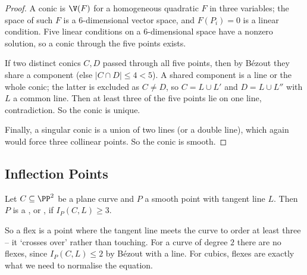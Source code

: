 \begin{proof}
	A conic is $\V(F)$ for a homogeneous quadratic $F$ in three variables; the space of such $F$ is a $6$-dimensional vector space, and $F(P_i) = 0$ is a linear condition. Five linear conditions on a $6$-dimensional space have a nonzero solution, so a conic through the five points exists.

	If two distinct conics $C, D$ passed through all five points, then by B\'ezout they share a component (else $|C\cap D| \leq 4 < 5$). A shared component is a line or the whole conic; the latter is excluded as $C \neq D$, so $C = L \cup L'$ and $D = L \cup L''$ with $L$ a common line. Then at least three of the five points lie on one line, contradiction. So the conic is unique.

	Finally, a singular conic is a union of two lines (or a double line), which again would force three collinear points. So the conic is smooth.
\end{proof}

\subsection{Inflection Points}

\begin{definition}[Flex]
	Let $C \subseteq \PP^2$ be a plane curve and $P$ a smooth point with tangent line $L$. Then $P$ is a , or , if $I_P(C,L) \geq 3$.
\end{definition}

So a flex is a point where the tangent line meets the curve to order at least three -- it `crosses over' rather than touching. For a curve of degree $2$ there are no flexes, since $I_P(C,L) \leq 2$ by B\'ezout with a line. For cubics, flexes are exactly what we need to normalise the equation.

